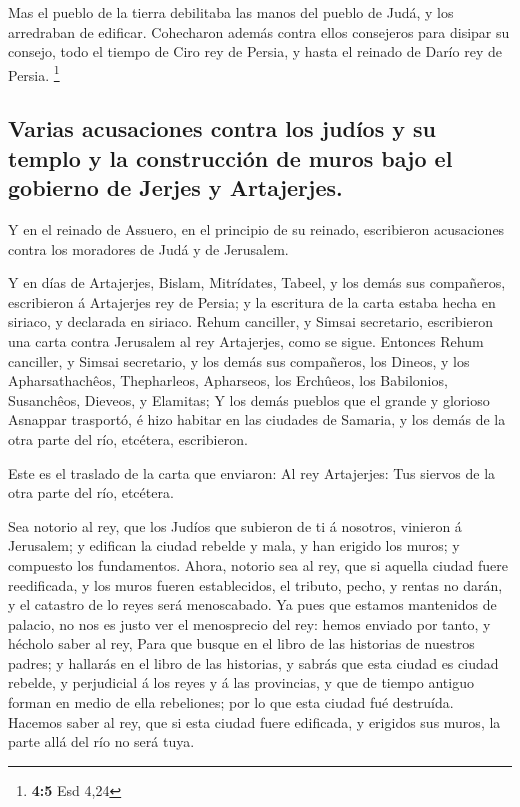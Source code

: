  Mas el pueblo de la tierra debilitaba las manos del pueblo
de Judá, y los arredraban de edificar.  Cohecharon además
contra ellos consejeros para disipar su consejo, todo el tiempo de Ciro
rey de Persia, y hasta el reinado de Darío rey de Persia. \footnote{\textbf{4:5}
  Esd 4,24}

\hypertarget{varias-acusaciones-contra-los-juduxedos-y-su-templo-y-la-construcciuxf3n-de-muros-bajo-el-gobierno-de-jerjes-y-artajerjes.}{%
\subsection{Varias acusaciones contra los judíos y su templo y la
construcción de muros bajo el gobierno de Jerjes y
Artajerjes.}\label{varias-acusaciones-contra-los-juduxedos-y-su-templo-y-la-construcciuxf3n-de-muros-bajo-el-gobierno-de-jerjes-y-artajerjes.}}

 Y en el reinado de Assuero, en el principio de su reinado,
escribieron acusaciones contra los moradores de Judá y de Jerusalem.

 Y en días de Artajerjes, Bislam, Mitrídates, Tabeel, y los
demás sus compañeros, escribieron á Artajerjes rey de Persia; y la
escritura de la carta estaba hecha en siriaco, y declarada en siriaco.
 Rehum canciller, y Simsai secretario, escribieron una carta
contra Jerusalem al rey Artajerjes, como se sigue.  Entonces
Rehum canciller, y Simsai secretario, y los demás sus compañeros, los
Dineos, y los Apharsathachêos, Thepharleos, Apharseos, los Erchûeos, los
Babilonios, Susanchêos, Dieveos, y Elamitas;  Y los demás
pueblos que el grande y glorioso Asnappar trasportó, é hizo habitar en
las ciudades de Samaria, y los demás de la otra parte del río, etcétera,
escribieron.

 Este es el traslado de la carta que enviaron: Al rey
Artajerjes: Tus siervos de la otra parte del río, etcétera.

 Sea notorio al rey, que los Judíos que subieron de ti á
nosotros, vinieron á Jerusalem; y edifican la ciudad rebelde y mala, y
han erigido los muros; y compuesto los fundamentos.  Ahora,
notorio sea al rey, que si aquella ciudad fuere reedificada, y los muros
fueren establecidos, el tributo, pecho, y rentas no darán, y el catastro
de lo reyes será menoscabado.  Ya pues que estamos
mantenidos de palacio, no nos es justo ver el menosprecio del rey: hemos
enviado por tanto, y hécholo saber al rey,  Para que busque
en el libro de las historias de nuestros padres; y hallarás en el libro
de las historias, y sabrás que esta ciudad es ciudad rebelde, y
perjudicial á los reyes y á las provincias, y que de tiempo antiguo
forman en medio de ella rebeliones; por lo que esta ciudad fué
destruída.  Hacemos saber al rey, que si esta ciudad fuere
edificada, y erigidos sus muros, la parte allá del río no será tuya.

